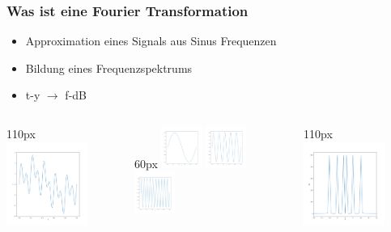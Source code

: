 
\begin{frame}
    \frametitle{Was ist eine Fourier Transformation}
    \begin{itemize}
        \item Approximation eines Signals aus Sinus Frequenzen 
        \item Bildung eines Frequenzspektrums
        \item t-y $\rightarrow$ f-dB
    \end{itemize}    

    \begin{columns}
        \begin{column}{110px}
            \includegraphics[width=100px]{images/01-what-is-fourier-signal.png}
        \end{column}
        \hspace*{-50px}
        \rightarrow
        \begin{column}{60px}
            \centering
            \includegraphics[width=50px]{images/01-what-is-fourier-signal-component-1.png}
            \includegraphics[width=50px]{images/01-what-is-fourier-signal-component-2.png}
            \includegraphics[width=50px]{images/01-what-is-fourier-signal-component-3.png}
        \end{column}
        \hspace*{-40px}
        \rightarrow
        \begin{column}{110px}
            \includegraphics[width=100px]{images/01-what-is-fourier-signal-transform.png}
        \end{column}
    \end{columns}

\end{frame}
